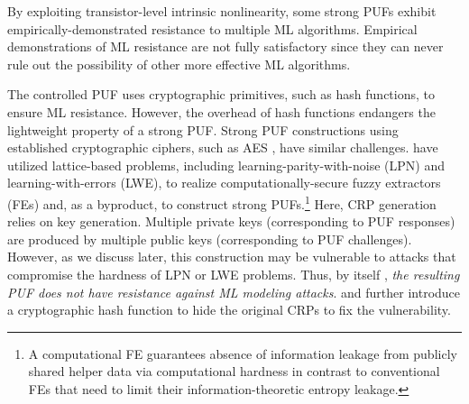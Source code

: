 By exploiting transistor-level intrinsic nonlinearity, some strong PUFs \cite{kumar2014design, zhuang2019strong} exhibit empirically-demonstrated resistance to multiple ML algorithms. 
Empirical demonstrations of ML resistance are not fully satisfactory since they can never rule out the possibility of other more effective ML algorithms. 

The controlled PUF \cite{gassend2008controlled} uses cryptographic primitives, such as hash functions, to ensure ML resistance. However, the overhead of hash functions endangers the lightweight property of a strong PUF. Strong PUF constructions using established cryptographic ciphers, such as AES \cite{bhargava2014efficient}, have similar challenges. \cite{fuller2013computational,herder2017trapdoor,jin2017fpga} have utilized lattice-based problems, including learning-parity-with-noise (LPN) and learning-with-errors (LWE), to realize computationally-secure fuzzy extractors (FEs) and, as a byproduct, to construct strong PUFs.\footnote{A computational FE guarantees absence of information leakage from publicly shared helper data via computational hardness in contrast to conventional FEs that need to limit their information-theoretic entropy leakage.} Here, CRP generation relies on key generation. Multiple private keys (corresponding to PUF responses) are produced by multiple public keys (corresponding to PUF challenges). However, as we discuss later, this construction may be vulnerable to attacks that compromise the hardness of LPN or LWE problems. Thus, by itself \cite{fuller2013computational,herder2017trapdoor,jin2017fpga}, \emph{the resulting PUF does not have resistance against ML modeling attacks}. 
\cite{herder2017trapdoor} and \cite{jin2017fpga} further introduce a cryptographic hash function to hide the original CRPs to fix the vulnerability.


